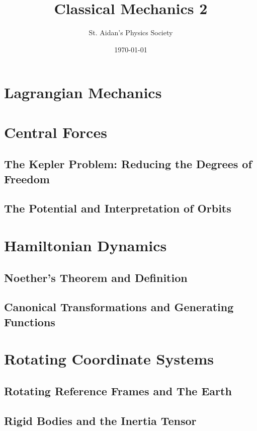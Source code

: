 \documentclass[12pt,%
               a4paper]{physics_notes}
\begin{document}
\title{Classical Mechanics 2}
\author{St. Aidan's Physics Society}
\date{\today}
\maketitle

\tableofcontents
\newpage

\section{Lagrangian Mechanics}



\section{Central Forces}
\subsection{The Kepler Problem: Reducing the Degrees of Freedom}
\subsection{The Potential and Interpretation of Orbits}

\section{Hamiltonian Dynamics}
\subsection{Noether's Theorem and Definition} %
\subsection{Canonical Transformations and Generating Functions}

\section{Rotating Coordinate Systems}
\subsection{Rotating Reference Frames and The Earth}
\subsection{Rigid Bodies and the Inertia Tensor}
 
\end{document}
